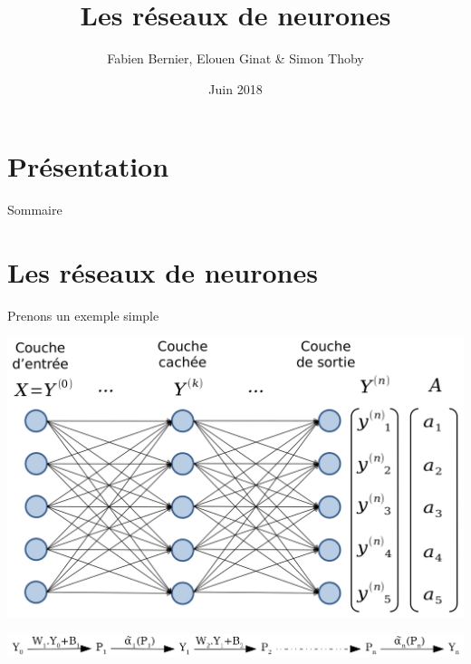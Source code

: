 \documentclass[ignorenonframetext,]{beamer}
\title{Les réseaux de neurones}
\author{Fabien Bernier, Elouen Ginat \& Simon Thoby}
\date{Juin 2018}
\begin{document}
\section*{Présentation}
\frame{\titlepage}

\begin{frame}{Sommaire}
\tableofcontents
\end{frame}

\section{Les réseaux de neurones}
\frame{\sectionpage}
\begin{frame}{Prenons un exemple simple}

\includegraphics{net.png}

\end{frame}

\begin{frame}{}

\includegraphics{net2.png}

\end{frame}
\end{document}
